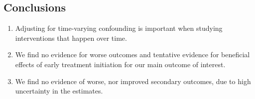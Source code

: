 \documentclass[a0,portrait]{a0poster}\usepackage[]{graphicx}\usepackage[svgnames]{xcolor}
\begin{document}
\begin{multicols}{2}
\begin{tcolorbox}[colback=yellow!25!white,colframe=yellow!25!white,boxsep=0.75cm]
\section*{Conclusions}
\begin{enumerate}
\item Adjusting for time-varying confounding is important when studying interventions that happen over time.
\item We find no evidence for worse outcomes and tentative evidence for beneficial effects of early treatment initiation for our main outcome of interest.
\item We find no evidence of worse, nor improved secondary outcomes, due to high uncertainty in the estimates.
\end{enumerate}
\end{tcolorbox}





\end{multicols}
\end{document}
